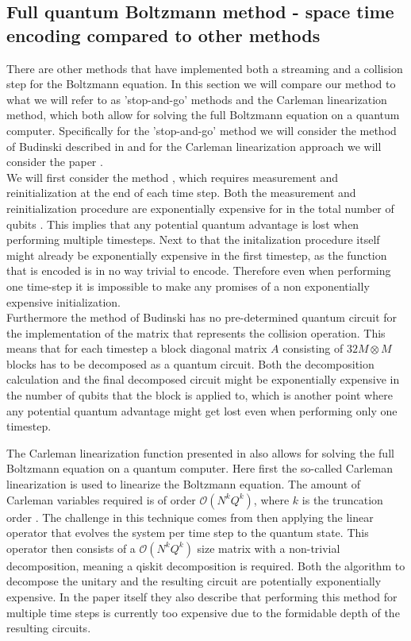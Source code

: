\subsection{Full quantum Boltzmann method - space time encoding compared to other methods}
There are other methods that have implemented both a streaming and a collision step for the Boltzmann equation. In this section we will compare our method to what we will refer to as 'stop-and-go' methods and the Carleman linearization method, which both allow for solving the full Boltzmann equation on a quantum computer. Specifically for the 'stop-and-go' method we will consider the method of Budinski described in \cite{Budinski2021} and for the Carleman linearization approach we will consider the paper \cite{Sanavio2023}. \\

We will first consider the method \cite{Budinski2021}, which requires measurement and reinitialization at the end of each time step. Both the measurement and reinitialization procedure are exponentially expensive for in the total number of qubits \cite{Shende2004}. This implies that any potential quantum advantage is lost when performing multiple timesteps. Next to that the initalization procedure itself might already be exponentially expensive in the first timestep, as the function that is encoded is in no way trivial to encode. Therefore even when performing one time-step it is impossible to make any promises of a non exponentially expensive initialization. \\
Furthermore the method of Budinski has no pre-determined quantum circuit for the implementation of the matrix that represents the collision operation. This means that for each timestep a block diagonal matrix $A$ consisting of $32 M \otimes M$ blocks has to be decomposed as a quantum circuit. Both the decomposition calculation and the final decomposed circuit might be exponentially expensive in the number of qubits that the block is applied to, which is another point where any potential quantum advantage might get lost even when performing only one timestep. 


The Carleman linearization function presented in \cite{Sanavio2023} also allows for solving the full Boltzmann equation on a quantum computer. Here first the so-called Carleman linearization is used to linearize the Boltzmann equation. The amount of Carleman variables required is of order $\mathcal{O} \left ( N^k Q^k \right )$, where $k$ is the truncation order \cite{Sanavio2023}. The challenge in this technique comes from then applying the linear operator that evolves the system per time step to the quantum state. This operator then consists of a $\mathcal{O} \left ( N^k Q^k \right )$ size matrix with a non-trivial decomposition, meaning a qiskit decomposition is required. Both the algorithm to decompose the unitary and the resulting circuit are potentially exponentially expensive. In the paper itself they also describe that performing this method for multiple time steps is currently too expensive due to the formidable depth of the resulting circuits.

